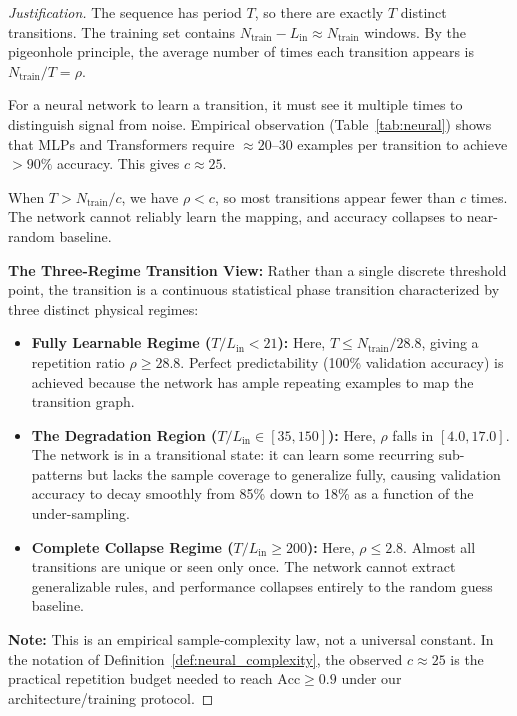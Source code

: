 \documentclass[11pt]{article}
\theoremstyle{plain}
\theoremstyle{definition}
\begin{document}
\begin{proof}[Justification]
The sequence has period $T$, so there are exactly $T$ distinct transitions. The training set contains $N_{\mathrm{train}} - L_{\mathrm{in}} \approx N_{\mathrm{train}}$ windows. By the pigeonhole principle, the average number of times each transition appears is $N_{\mathrm{train}}/T = \rho$.

For a neural network to learn a transition, it must see it multiple times to distinguish signal from noise. Empirical observation (Table~\ref{tab:neural}) shows that MLPs and Transformers require $\approx 20$--$30$ examples per transition to achieve $>90\%$ accuracy. This gives $c \approx 25$.

When $T > N_{\mathrm{train}}/c$, we have $\rho < c$, so most transitions appear fewer than $c$ times. The network cannot reliably learn the mapping, and accuracy collapses to near-random baseline.

\textbf{The Three-Regime Transition View:}
Rather than a single discrete threshold point, the transition is a continuous statistical phase transition characterized by three distinct physical regimes:
\begin{itemize}[leftmargin=2em]
\item \textbf{Fully Learnable Regime ($T/L_{\mathrm{in}} < 21$):} Here, $T \le N_{\mathrm{train}}/28.8$, giving a repetition ratio $\rho \ge 28.8$. Perfect predictability (100\% validation accuracy) is achieved because the network has ample repeating examples to map the transition graph.
\item \textbf{The Degradation Region ($T/L_{\mathrm{in}} \in [35, 150]$):} Here, $\rho$ falls in $[4.0, 17.0]$. The network is in a transitional state: it can learn some recurring sub-patterns but lacks the sample coverage to generalize fully, causing validation accuracy to decay smoothly from 85\% down to 18\% as a function of the under-sampling.
\item \textbf{Complete Collapse Regime ($T/L_{\mathrm{in}} \ge 200$):} Here, $\rho \le 2.8$. Almost all transitions are unique or seen only once. The network cannot extract generalizable rules, and performance collapses entirely to the random guess baseline.
\end{itemize}

\textbf{Note:} This is an empirical sample-complexity law, not a universal constant. In the notation of Definition~\ref{def:neural_complexity}, the observed $c\approx 25$ is the practical repetition budget needed to reach $\mathrm{Acc}\ge 0.9$ under our architecture/training protocol.


\end{proof}
\end{document}
